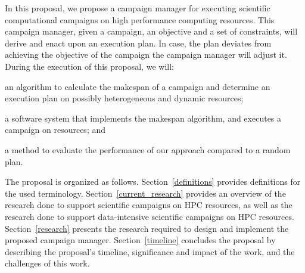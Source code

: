 In this proposal, we propose a campaign manager for executing scientific computational campaigns on high performance computing resources.
This campaign manager, given a campaign, an objective and a set of constraints, will derive and enact upon an execution plan. In case, the plan deviates from achieving the objective of the campaign the campaign manager will adjust it.
During the execution of this proposal, we will:
\begin{inparaenum}[(1)]
\item an algorithm to calculate the makespan of a campaign and determine an execution plan on possibly heterogeneous and dynamic resources;
\item a software system that implements the makespan algorithm, and executes a campaign on resources; and 
\item a method to evaluate the performance of our approach compared to a random plan. 
\end{inparaenum}

The proposal is organized as follows.
Section~\ref{definitions} provides definitions for the used terminology.
Section~\ref{current_research} provides an overview of the research done to support scientific campaigns on HPC resources, as well as the research done to support data-intensive scientific campaigns on HPC resources.
Section~\ref{research} presents the research required to design and implement the proposed campaign manager.
Section~\ref{timeline} concludes the proposal by describing the proposal's timeline, significance and impact of the work, and the challenges of this work.